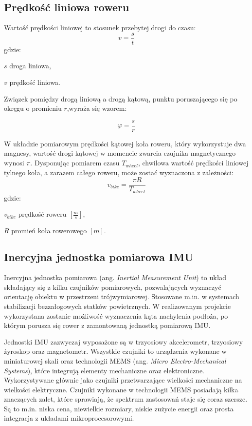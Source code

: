 \subsection{Prędkość liniowa roweru}
Wartość prędkości liniowej to stosunek przebytej drogi do czasu:
\begin{equation}
    v = \frac{s}{t}
\end{equation}
gdzie:
\begin{eqwhere}[2cm]
	\item[$s$] droga liniowa,
	\item[$v$] prędkość liniowa.
\end{eqwhere}
 Związek pomiędzy drogą liniową a drogą kątową, punktu poruszającego się po okręgu o promieniu $r$,wyraża się wzorem:

\begin{equation}
    \varphi = \frac{s}{r}
\end{equation}

W układzie pomiarowym prędkości kątowej koła roweru, który wykorzystuje dwa magnesy, wartość drogi kątowej w momencie zwarcia czujnika magnetycznego wynosi $\pi$. Dysponując pomiarem czasu $T_{wheel}$, chwilowa wartość prędkości liniowej tylnego koła, a zarazem całego roweru, może zostać wyznaczona z zależności:
 \begin{equation}
    \label{eq:zaleznoscNaPredkosc}
    v_{bike} = \frac{\pi R}{T_{wheel}}
\end{equation}
gdzie:
\begin{eqwhere}[2cm]
    \item[$v_{bike}$] prędkość roweru $[\frac{m}{s}]$,
	\item[$R$] promień koła rowerowego $[m]$.
\end{eqwhere}
\subsection{Inercyjna jednostka pomiarowa IMU}
Inercyjna jednostka pomiarowa (ang. {\em Inertial Measurement Unit}) to układ składający się z kilku czujników pomiarowych, pozwalających wyznaczyć orientację obiektu w przestrzeni trójwymiarowej. Stosowane m.in. w systemach stabilizacji bezzałogowych statków powietrznych. W realizowanym projekcie wykorzystana zostanie możliwość wyznaczenia kąta nachylenia podłoża, po którym porusza się rower z zamontowaną jednostką pomiarową IMU.

Jednostki IMU zazwyczaj wyposażone są w trzyosiowy akcelerometr, trzyosiowy żyroskop oraz magnetometr. Wszystkie czujniki to urządzenia wykonane w miniaturowej skali oraz technologii MEMS (ang. {\em Micro Electro-Mechanical Systems}), które integrują elementy mechaniczne oraz elektroniczne. Wykorzystywane głównie jako czujniki przetwarzające wielkości mechaniczne na wielkości elektryczne. Czujniki wykonane w technologii MEMS posiadają kilka znaczących zalet, które sprawiają, że spektrum zastosowań staje się coraz szersze. Są to m.in. niska cena, niewielkie rozmiary, niskie zużycie energii oraz prosta integracja z układami mikroprocesorowymi. 


